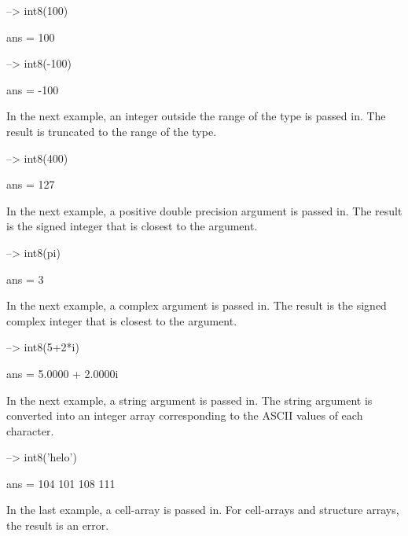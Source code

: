 \begin{DoxyVerbInclude}
--> int8(100)

ans = 
 100 

--> int8(-100)

ans = 
 -100 
\end{DoxyVerbInclude}


In the next example, an integer outside the range of the type is passed in. The result is truncated to the range of the type.


\begin{DoxyVerbInclude}
--> int8(400)

ans = 
 127 
\end{DoxyVerbInclude}


In the next example, a positive double precision argument is passed in. The result is the signed integer that is closest to the argument.


\begin{DoxyVerbInclude}
--> int8(pi)

ans = 
 3 
\end{DoxyVerbInclude}


In the next example, a complex argument is passed in. The result is the signed complex integer that is closest to the argument.


\begin{DoxyVerbInclude}
--> int8(5+2*i)

ans = 
   5.0000 +  2.0000i 
\end{DoxyVerbInclude}


In the next example, a string argument is passed in. The string argument is converted into an integer array corresponding to the A\-S\-C\-I\-I values of each character.


\begin{DoxyVerbInclude}
--> int8('helo')

ans = 
 104 101 108 111 
\end{DoxyVerbInclude}


In the last example, a cell-\/array is passed in. For cell-\/arrays and structure arrays, the result is an error.


